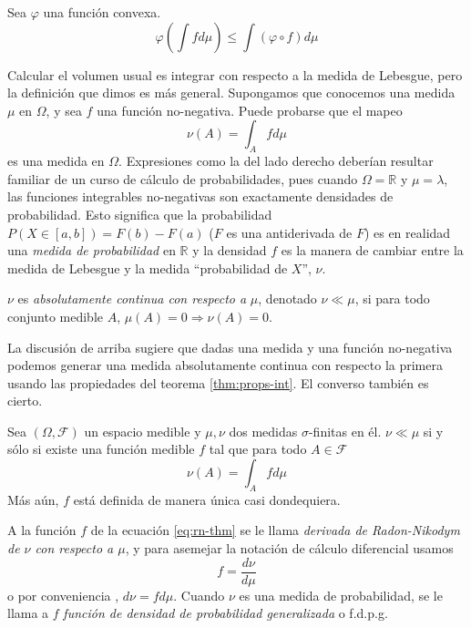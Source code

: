 \documentclass[main.tex]{subfiles}
\begin{document}
\begin{prop}\label{thm:jensen}
Sea $\varphi$ una función convexa.
\begin{equation*}
			\varphi\left(\int fd\mu \right) \leq \int\left(\varphi\circ f\right)d\mu
\end{equation*}
\end{prop}


Calcular el volumen usual es integrar con respecto a la medida de Lebesgue, pero la definición que dimos es más general. Supongamos que conocemos una medida $\mu$ en $\Omega$, y sea $f$ una función no-negativa. Puede probarse que el mapeo
\begin{equation*}
	\nu(A)=\int_Afd\mu 
\end{equation*} 
es una medida en $\Omega$. Expresiones como la del lado derecho deberían resultar familiar de un curso de cálculo de probabilidades, pues cuando $\Omega=\mathbb{R}$ y $\mu=\lambda$, las funciones integrables no-negativas son exactamente densidades de probabilidad. Esto significa que la probabilidad $P(X\in [a,b])=F(b)-F(a)$ ($F$ es una antiderivada de $F$) es en realidad una \textit{medida de probabilidad} en $\mathbb{R}$ y la densidad $f$ es la manera de cambiar entre la medida de Lebesgue y la medida \enquote{probabilidad de $X$}, $\nu$. 

\begin{definition}
$\nu$ es \textit{absolutamente continua con respecto a} $\mu$, denotado $\nu \ll \mu$, si para todo conjunto medible $A$, $\mu(A)=0 \Rightarrow \nu(A)=0$. 
\end{definition}

La discusión de arriba sugiere que dadas una medida y una función no-negativa podemos generar una medida absolutamente continua con respecto la primera usando las propiedades del teorema \ref{thm:props-int}. El converso también es cierto.

\begin{theorem}
Sea $(\Omega, \mathcal{F})$ un espacio medible y $\mu, \nu$ dos medidas $\sigma$-finitas en él. $\nu \ll \mu$ si y sólo si existe una función medible $f$ tal que para todo $A \in \mathcal{F}$
\begin{equation}\label{eq:rn-thm}
	\nu(A) = \int_A f d\mu
\end{equation}
Más aún, $f$ está definida de manera única casi dondequiera.
\end{theorem}

\begin{definition}
A la función $f$ de la ecuación \eqref{eq:rn-thm} se le llama \textit{derivada de Radon-Nikodym de $\nu$ con respecto a $\mu$}, y para asemejar la notación de cálculo diferencial usamos 
\begin{equation*}
f = \frac{d\nu}{d\mu}	
\end{equation*}
o por conveniencia , $d\nu = fd\mu$. Cuando $\nu$ es una medida de probabilidad, se le llama a $f$ \textit{función de densidad de probabilidad generalizada} o f.d.p.g.
\end{definition}
\end{document}
